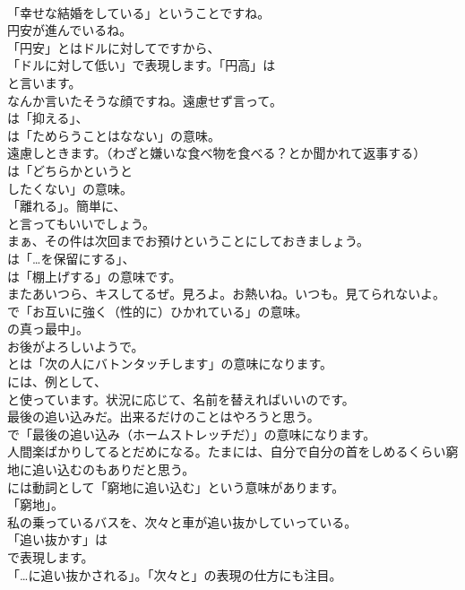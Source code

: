 \documentclass[8pt]{extreport}
\begin{document}
\begin{CJK}{UTF8}{min}
\\	「幸せな結婚をしている」ということですね。	
\\	円安が進んでいるね。 
\\	「円安」とはドルに対してですから、
\\	「ドルに対して低い」で表現します。「円高」は
\\	と言います。	
\\	なんか言いたそうな顔ですね。遠慮せず言って。 
\\	は「抑える」、
\\	は「ためらうことはなない」の意味。	
\\	遠慮しときます。（わざと嫌いな食べ物を食べる？とか聞かれて返事する） 
\\	は「どちらかというと 
\\	したくない」の意味。
\\	「離れる」。簡単に、
\\	と言ってもいいでしょう。	
\\	まぁ、その件は次回までお預けということにしておきましょう。 
\\	は「…を保留にする」、
\\	は「棚上げする」の意味です。	
\\	またあいつら、キスしてるぜ。見ろよ。お熱いね。いつも。見てられないよ。 
\\	で「お互いに強く（性的に）ひかれている」の意味。
\\	の真っ最中」。	
\\	お後がよろしいようで。 
\\	とは「次の人にバトンタッチします」の意味になります。
\\	には、例として、
\\	と使っています。状況に応じて、名前を替えればいいのです。	
\\	最後の追い込みだ。出来るだけのことはやろうと思う。 
\\	で「最後の追い込み（ホームストレッチだ）」の意味になります。	
\\	人間楽ばかりしてるとだめになる。たまには、自分で自分の首をしめるくらい窮地に追い込むのもありだと思う。 
\\	には動詞として「窮地に追い込む」という意味があります。
\\	「窮地」。	
\\	私の乗っているバスを、次々と車が追い抜かしていっている。 
\\	「追い抜かす」は
\\	で表現します。
\\	「…に追い抜かされる」。「次々と」の表現の仕方にも注目。	

\end{CJK}
\end{document}
